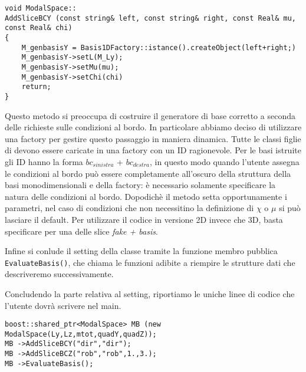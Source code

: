 \begin{lstlisting}[style = general]
void ModalSpace::
AddSliceBCY (const string& left, const string& right, const Real& mu, const Real& chi)
{
	M_genbasisY = Basis1DFactory::istance().createObject(left+right;)
	M_genbasisY->setL(M_Ly);
	M_genbasisY->setMu(mu);
	M_genbasisY->setChi(chi)
	return;
}
\end{lstlisting}
Questo metodo si preoccupa di costruire il generatore di base corretto a seconda delle richieste sulle condizioni al bordo.
In particolare abbiamo deciso di utilizzare una factory per gestire questo passaggio in maniera dinamica.
Tutte le classi figlie di  devono essere caricate in una factory con un ID ragionevole.
Per le basi istruite gli ID hanno la forma $bc_{sinistra}$ + $bc_{destra}$, in questo modo
quando l'utente assegna le condizioni al bordo pu\`o essere completamente all'oscuro della struttura della basi monodimensionali e
della factory: \`e necessario solamente specificare la natura delle condizioni al bordo. Dopodich\`e il metodo setta opportunamente i parametri, nel caso di condizioni che non necessitino la definizione di $\chi$ o $\mu$
si pu\`o lasciare il default. Per utilizzare
il codice in versione 2D invece che 3D, basta specificare per una delle slice \emph{fake + basis}.


Infine si conlude il setting della classe  tramite la funzione membro pubblica \texttt{EvaluateBasis()}, 
che chiama le funzioni adibite a riempire le strutture dati che descriveremo successivamente.

Concludendo la parte relativa al setting, riportiamo le uniche linee di codice che l'utente dovr\`a scrivere nel 
main.
\begin{lstlisting}[style = general]
boost::shared_ptr<ModalSpace> MB (new ModalSpace(Ly,Lz,mtot,quadY,quadZ));
MB ->AddSliceBCY("dir","dir");
MB ->AddSliceBCZ("rob","rob",1.,3.);
MB ->EvaluateBasis();
\end{lstlisting}

